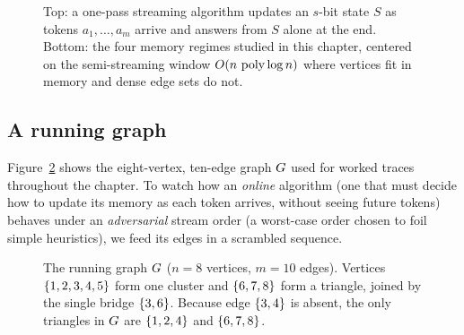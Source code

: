 \begin{figure}[htbp]
\caption{Top: a one-pass streaming algorithm updates an $s$-bit state $S$ as tokens $a_1,\dots,a_m$ arrive and answers from $S$ alone at the end. Bottom: the four memory regimes studied in this chapter, centered on the semi-streaming window $O(n\,\operatorname{poly}\log n)$ where vertices fit in memory and dense edge sets do not.}
\label{ch40:fig-regimes}
\end{figure}

\subsection{A running graph}

Figure~\ref{ch40:fig-running} shows the eight-vertex, ten-edge graph $G$ used
for worked traces throughout the chapter. To watch how an \emph{online}
algorithm (one that must decide how to update its memory as each token arrives,
without seeing future tokens) behaves under an \emph{adversarial} stream order
(a worst-case order chosen to foil simple heuristics), we feed its edges in a
scrambled sequence.

\begin{figure}[htbp]
\centering
{}
\caption{The running graph $G$ ($n=8$ vertices, $m=10$ edges). Vertices
$\{1,2,3,4,5\}$ form one cluster and $\{6,7,8\}$ form a triangle, joined by
the single bridge $\{3,6\}$. Because edge $\{3,4\}$ is absent, the only
triangles in $G$ are $\{1,2,4\}$ and $\{6,7,8\}$.}
\label{ch40:fig-running}
\end{figure}

